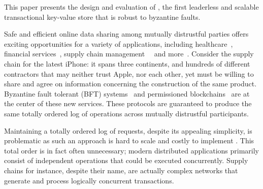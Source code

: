 This paper presents the design and evaluation of \sys{}, the
first leaderless and scalable transactional key-value store that is robust to byzantine faults.

Safe and efficient online data sharing among mutually distrustful
parties offers exciting opportunities for a variety of applications,
including healthcare~\cite{}, financial services~\cite{}, supply chain
management~~\cite{} and more~\cite{}. Consider the supply chain for the latest iPhone: it spans three continents, and hundreds of different contractors \cite{AppleSup} that may neither trust Apple, nor each other, yet must be willing to share and agree on information concerning the construction of the same product.
Byzantine fault tolerant (BFT)
systems~\cite{castro1999practical,martin2006fast,kotla2007zyzzyva,  gueta2018sbft,clement2009making,buchman2016tendermint,yin2019hotstuff,Clement09Upright,duan2014hbft, pires2018generalized,bessani2014state,lamport2011byzantizing,arun2019ezbft, malkhi2019flexible,duan2014hbft,yin2003separating, Guerraoui08Next, Kotla04High,liskov2010viewstamped} and permissioned blockchains~\cite{Hyperledger,EthereumQuorum, buchman2016tendermint, al2017chainspace,kokoris2018omniledger,gilad2017algorand, baudet2019state} are at the center of these new services. These protocols are guaranteed to
produce the same totally ordered log of operations across mutually distrustful
participants. 

Maintaining a totally ordered log of requests, despite its appealing simplicity, is problematic as such an approach is hard to scale  and costly to implement . This total order is in fact often unnecessary; modern distributed applications primarily consist of independent operations that could be executed concurrently. Supply chains for instance, despite their name, are actually complex networks that generate and process logically concurrent transactions. 


